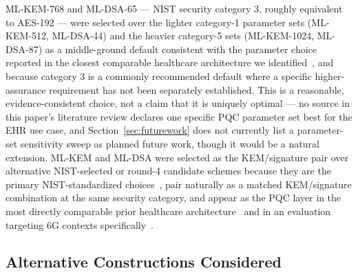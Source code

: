 \documentclass[journal]{IEEEtran}
\begin{document}
ML-KEM-768 and ML-DSA-65 --- NIST security category 3, roughly equivalent to AES-192 --- were selected over the lighter category-1 parameter sets (ML-KEM-512, ML-DSA-44) and the heavier category-5 sets (ML-KEM-1024, ML-DSA-87) as a middle-ground default consistent with the parameter choice reported in the closest comparable healthcare architecture we identified~\cite{devaraj2026postquantum}, and because category 3 is a commonly recommended default where a specific higher-assurance requirement has not been separately established. This is a reasonable, evidence-consistent choice, not a claim that it is uniquely optimal --- no source in this paper's literature review declares one specific PQC parameter set best for the EHR use case, and Section~\ref{sec:futurework} does not currently list a parameter-set sensitivity sweep as planned future work, though it would be a natural extension. ML-KEM and ML-DSA were selected as the KEM/signature pair over alternative NIST-selected or round-4 candidate schemes because they are the primary NIST-standardized choices~\cite{nist2024fips203,nist2024fips204}, pair naturally as a matched KEM/signature combination at the same security category, and appear as the PQC layer in the most directly comparable prior healthcare architecture~\cite{devaraj2026postquantum} and in an evaluation targeting 6G contexts specifically~\cite{kudaloor2026towardquantumsafe}.

\subsection{Alternative Constructions Considered}
\end{document}
